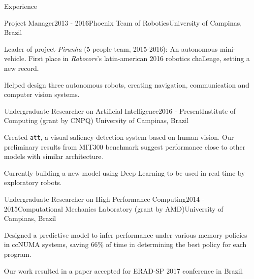 \documentclass[8pt]{resume}
\newcommand{\tit}[1]{\textit{#1}}
\newcommand{\ttt}[1]{\texttt{#1}}
\begin{document}
\begin{rSection}{Experience}

\begin{rSubsection}{Project Manager}{2013 - 2016}{Phoenix Team of Robotics}{University of Campinas, Brazil}
    \item Leader of project \tit{Piranha} (5 people team, 2015-2016):
        An autonomous mini-vehicle.
        First place in \tit{Robocore}'s latin-american 2016 robotics challenge, setting a new record.
    \item Helped design three autonomous robots, creating navigation,
        communication and computer vision systems.
\end{rSubsection}

\begin{rSubsection}{Undergraduate Researcher on Artificial Intelligence}{2016 - Present}{Institute of Computing (grant by CNPQ)}
    {University of Campinas, Brazil}
    \item Created \ttt{att}, a visual saliency detection system based on human
        vision.
        Our preliminary results from MIT300 benchmark suggest performance
        close to other models with similar architecture.
    \item Currently building a new model using Deep Learning to be used in real
        time by exploratory robots.
\end{rSubsection}

\begin{rSubsection}{Undergraduate Researcher on High Performance Computing}{2014 - 2015}{Computational Mechanics Laboratory (grant by AMD)}{University of Campinas, Brazil}
    \item Designed a predictive model to infer performance under
        various memory policies in ccNUMA systems, saving $66\%$ of time in
        determining the best policy for each program.
    \item Our work resulted in a paper accepted for ERAD-SP 2017 conference in Brazil.
\end{rSubsection}


\end{rSection}
\end{document}
